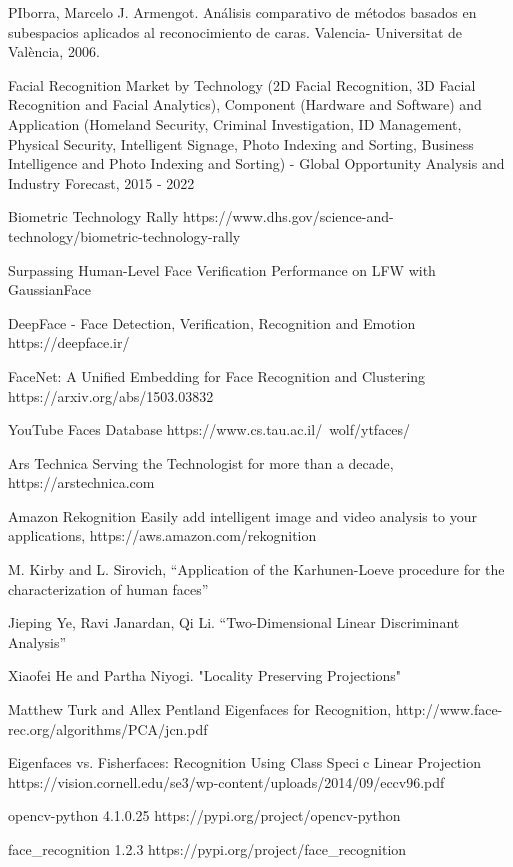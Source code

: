 \documentclass[a4paper,11pt]{book}
\begin{document}
\begin{thebibliography}{aaaa}

PIborra, Marcelo J. Armengot. Análisis comparativo de métodos basados en subespacios
aplicados al reconocimiento de caras. Valencia- Universitat de València, 2006.

Facial Recognition Market by Technology (2D Facial Recognition, 3D Facial Recognition and Facial Analytics), Component (Hardware and Software) and Application (Homeland Security, Criminal Investigation, ID Management, Physical Security, Intelligent Signage, Photo Indexing and Sorting, Business Intelligence and Photo Indexing and Sorting) - Global Opportunity Analysis and Industry Forecast, 2015 - 2022


Biometric Technology Rally
https://www.dhs.gov/science-and-technology/biometric-technology-rally

Surpassing Human-Level Face Verification Performance on LFW with GaussianFace

DeepFace - Face Detection, Verification, Recognition and Emotion
https://deepface.ir/

FaceNet: A Unified Embedding for Face Recognition and Clustering
https://arxiv.org/abs/1503.03832

YouTube Faces Database
https://www.cs.tau.ac.il/~wolf/ytfaces/

Ars Technica
Serving the Technologist for more than a decade, https://arstechnica.com

Amazon Rekognition
Easily add intelligent image and video analysis to your applications, https://aws.amazon.com/rekognition

M. Kirby and L. Sirovich, “Application of the Karhunen-Loeve procedure for
the characterization of human faces” 

 Jieping Ye, Ravi Janardan, Qi Li. “Two-Dimensional Linear Discriminant Analysis”

Xiaofei He and Partha Niyogi. "Locality Preserving Projections"

Matthew Turk and Allex Pentland
Eigenfaces for Recognition, http://www.face-rec.org/algorithms/PCA/jcn.pdf

Eigenfaces vs. Fisherfaces:
Recognition Using Class Specic Linear Projection
https://vision.cornell.edu/se3/wp-content/uploads/2014/09/eccv96.pdf

opencv-python 4.1.0.25
https://pypi.org/project/opencv-python

face\_recognition 1.2.3
https://pypi.org/project/face\_recognition



\end{thebibliography}
\end{document}
